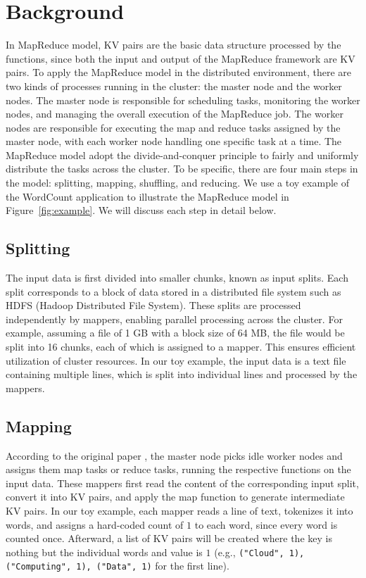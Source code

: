\section{Background}
\label{sec:background}



In MapReduce model, KV pairs are the basic data structure processed by the functions, since both the input and output of the MapReduce framework are KV pairs. To apply the MapReduce model in the distributed environment, there are two kinds of processes running in the cluster: the master node and the worker nodes. The master node is responsible for scheduling tasks, monitoring the worker nodes, and managing the overall execution of the MapReduce job. The worker nodes are responsible for executing the map and reduce tasks assigned by the master node, with each worker node handling one specific task at a time. The MapReduce model adopt the divide-and-conquer principle to fairly and uniformly distribute the tasks across the cluster. To be specific, there are four main steps in the model: splitting, mapping, shuffling, and reducing. We use a toy example of the WordCount application to illustrate the MapReduce model in Figure~\ref{fig:example}. We will discuss each step in detail below.

\subsection{Splitting}

The input data is first divided into smaller chunks, known as input splits. Each split corresponds to a block of data stored in a distributed file system such as HDFS (Hadoop Distributed File System). These splits are processed independently by mappers, enabling parallel processing across the cluster. For example, assuming a file of 1 GB with a block size of 64 MB, the file would be split into 16 chunks, each of which is assigned to a mapper. This ensures efficient utilization of cluster resources. In our toy example, the input data is a text file containing multiple lines, which is split into individual lines and processed by the mappers.

\subsection{Mapping}

According to the original paper \cite{dean2008mapreduce}, the master node picks idle worker nodes and assigns them map tasks or reduce tasks, running the respective functions on the input data. These mappers first read the content of the corresponding input split, convert it into KV pairs, and apply the map function to generate intermediate KV pairs. In our toy example, each mapper reads a line of text, tokenizes it into words, and assigns a hard-coded count of $1$ to each word, since every word is counted once. Afterward, a list of KV pairs will be created where the key is nothing but the individual words and value is $1$ (e.g., \texttt{("Cloud", 1), ("Computing", 1), ("Data", 1)} for the first line). 

